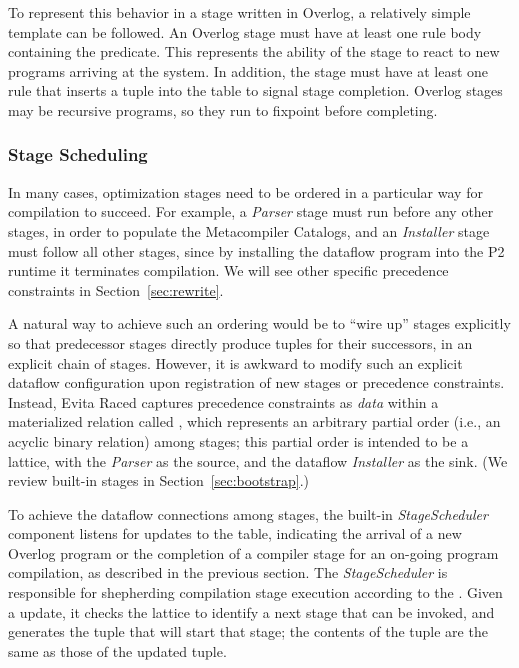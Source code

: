 To represent this behavior in a stage written in Overlog, a relatively
simple template can be followed.  An Overlog stage must have at least
one rule body containing the  predicate. This 
represents the ability of the stage to react to new programs arriving at
the system.  In addition, the stage must have
at least one rule that
inserts a  tuple into the  table to signal stage
completion.  Overlog stages may be recursive programs, so they run
to fixpoint before completing.

\subsubsection{Stage Scheduling}
\label{sec:stageschedule}
In many cases, optimization stages need to be ordered in a particular way for compilation to succeed.  For example, a {\em Parser} stage must run before any 
other stages, in order to populate the Metacompiler Catalogs, and an {\em Installer} stage must follow all 
other stages, since by installing the dataflow program into the P2 runtime it terminates compilation.  
We will see other specific precedence constraints in Section~\ref{sec:rewrite}.  


A natural way to achieve such an ordering would be to ``wire up'' stages explicitly so that 
predecessor stages directly produce  tuples for their successors, 
in an explicit chain of stages.  However, it is awkward to modify such an explicit dataflow configuration 
upon registration of new stages or precedence constraints. Instead, Evita Raced captures precedence 
constraints as {\em data} within a materialized
relation called , which represents an arbitrary partial
order (i.e., an acyclic binary relation) among stages; this partial
order is intended to be a lattice, with the {\em Parser} as the source,
and the dataflow {\em Installer} as the sink.  (We review built-in stages in Section~\ref{sec:bootstrap}.)
 
To achieve the dataflow connections among stages, the built-in {\em
  StageScheduler} component listens for
updates to the  table, indicating the arrival of a new
Overlog program or the completion of a compiler
stage for an on-going program compilation, as described in the previous section.  The {\em StageScheduler} is
responsible for shepherding compilation stage execution according to the
. Given a  update, it checks the lattice to identify a next stage
that can be invoked, and generates the
 tuple that will start that stage; the
contents of the tuple are the same as those of the updated
 tuple.  

